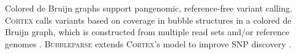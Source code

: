 Colored de Bruijn graphs support pangenomic, reference-free variant calling.
\textsc{Cortex} calls variants based on coverage in bubble structures in a colored de Bruijn graph, which is constructed from multiple read sets and/or reference genomes \cite{Iqbal_2012}.
\textsc{Bubbleparse} extends \textsc{Cortex}'s model to improve SNP discovery \cite{Leggett_2013}.


%

